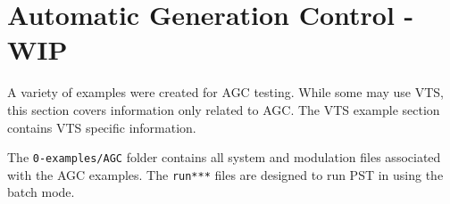\pagebreak
\section{Automatic Generation Control - WIP} 
A variety of examples were created for AGC testing.
While some may use VTS, this section covers information only related to AGC.
The VTS example section contains VTS specific information.

The \verb|0-examples/AGC| folder contains all system and modulation files associated with the AGC examples.
The \verb|run***| files are designed to run PST in using the batch mode.